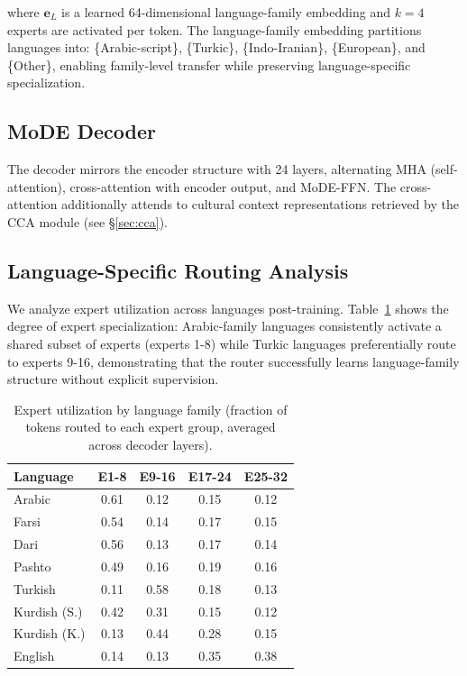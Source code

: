 \documentclass[11pt,twocolumn]{article}
\begin{document}
where $\mathbf{e}_L$ is a learned 64-dimensional language-family embedding and
$k=4$ experts are activated per token. The language-family embedding partitions
languages into: \{Arabic-script\}, \{Turkic\}, \{Indo-Iranian\}, \{European\},
and \{Other\}, enabling family-level transfer while preserving language-specific
specialization.

\subsection{MoDE Decoder}

The decoder mirrors the encoder structure with 24 layers, alternating MHA
(self-attention), cross-attention with encoder output, and MoDE-FFN. The
cross-attention additionally attends to cultural context representations
retrieved by the CCA module (see \S\ref{sec:cca}).

\subsection{Language-Specific Routing Analysis}

We analyze expert utilization across languages post-training. Table~\ref{tab:routing}
shows the degree of expert specialization: Arabic-family languages consistently
activate a shared subset of experts (experts 1-8) while Turkic languages
preferentially route to experts 9-16, demonstrating that the router
successfully learns language-family structure without explicit supervision.

\begin{table}[h]
\centering
\caption{Expert utilization by language family (fraction of tokens routed
to each expert group, averaged across decoder layers).}
\label{tab:routing}
\begin{tabular}{lcccc}
\toprule
\textbf{Language} & \textbf{E1-8} & \textbf{E9-16} & \textbf{E17-24} & \textbf{E25-32} \\
\midrule
Arabic & 0.61 & 0.12 & 0.15 & 0.12 \\
Farsi  & 0.54 & 0.14 & 0.17 & 0.15 \\
Dari   & 0.56 & 0.13 & 0.17 & 0.14 \\
Pashto & 0.49 & 0.16 & 0.19 & 0.16 \\
Turkish & 0.11 & 0.58 & 0.18 & 0.13 \\
Kurdish (S.) & 0.42 & 0.31 & 0.15 & 0.12 \\
Kurdish (K.) & 0.13 & 0.44 & 0.28 & 0.15 \\
English & 0.14 & 0.13 & 0.35 & 0.38 \\
\bottomrule
\end{tabular}
\end{table}
\end{document}
